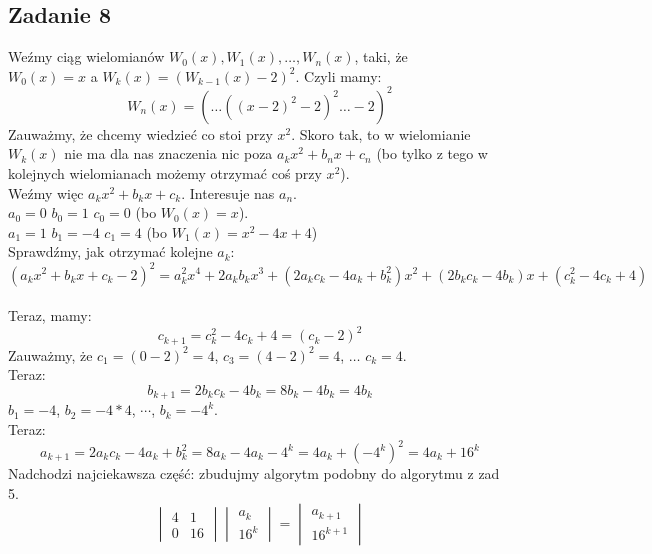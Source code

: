 \documentclass[a4paper]{article}
\begin{document}
\subsection*{Zadanie 8}
Weźmy ciąg wielomianów $W_0(x), W_1(x), \dots ,W_n(x)$, taki, że\\ $W_0(x)=x$ a $W_k(x)=(W_{k-1}(x)-2)^2$. Czyli mamy: $$W_n(x)=(\dots((x-2)^2-2)^2\dots-2)^2$$
Zauważmy, że chcemy wiedzieć co stoi przy $x^2$. Skoro tak, to w wielomianie $W_k(x)$ nie ma dla nas znaczenia nic poza $a_kx^2 + b_nx + c_n$ (bo tylko z tego w kolejnych wielomianach możemy otrzymać coś przy $x^2$).\\
Weźmy więc $a_kx^2 + b_kx + c_k$. Interesuje nas $a_n$.\\
$a_0=0$ $b_0=1$ $c_0=0$ (bo $W_0(x)=x$).\\
$a_1=1$ $b_1=-4$ $c_1=4$ (bo $W_1(x)=x^2-4x+4$)\\
Sprawdźmy, jak otrzymać kolejne $a_k$:\\
$$(a_kx^2+b_kx+c_k-2)^2=a_k^2x^4 + 2a_kb_kx^3 + (2a_k c_k -4 a_k + b_k^2)x^2 + (2b_kc_k-4b_k)x+(c_k^2-4c_k+4)$$\\
Teraz, mamy:\\
$$c_{k+1}=c_k^2-4c_k+4=(c_k-2)^2$$
Zauważmy, że $c_1=(0-2)^2=4$, $c_3=(4-2)^2=4$, $\dots$ $c_k=4$.\\
Teraz:\\
$$b_{k+1}=2b_kc_k-4b_k=8b_k-4b_k=4b_k$$ $b_1=-4$, $b_2=-4*4$, $\cdots$, $b_k=-4^k$.\\
Teraz:\\
$$a_{k+1}=2a_k c_k -4 a_k + b_k^2=8a_k -4 a_k - 4^k = 4a_k + (-4^k)^2 = 4a_k + 16^k$$
Nadchodzi najciekawsza część: zbudujmy algorytm podobny do algorytmu z zad 5.\\
$$\begin{vmatrix}
4 & 1 \\
0 & 16
\end{vmatrix}\begin{vmatrix}
a_k\\
16^k
\end{vmatrix}=\begin{vmatrix}
a_{k+1}\\
16^{k+1}
\end{vmatrix} $$
\end{document}
